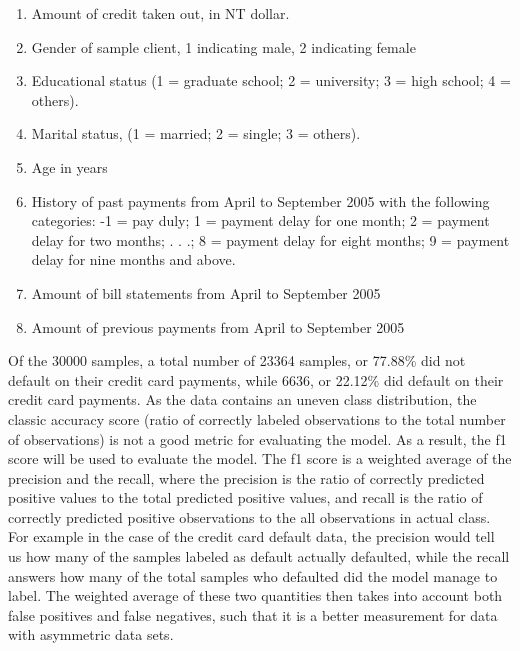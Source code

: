 \documentclass[a4paper,10pt,english]{article}
\begin{document}
\begin{enumerate}
    \item Amount of credit taken out, in NT dollar.
    \item Gender of sample client, 1 indicating male, 2 indicating female
    \item Educational status (1 = graduate school; 2 = university; 3 = high school; 4 = others).
    \item Marital status, (1 = married; 2 = single; 3 = others).
    \item Age in years
    \item History of past payments from April to September 2005 with the following categories: -1 = pay duly; 1 = payment delay for one month; 2 = payment delay for two months; . . .; 8 = payment delay for eight months; 9 = payment delay for nine months and above.
    \item Amount of bill statements from April to September 2005
    \item Amount of previous payments from April to September 2005
\end{enumerate}

Of the 30000 samples, a total number of 23364 samples, or 77.88\% did not default on their credit card payments, while 6636, or 22.12\% did default on their credit card payments. As the data contains an uneven class distribution, the classic accuracy score (ratio of correctly labeled observations to the total number of observations) is not a good metric for evaluating the model. As a result, the f1 score will be used to evaluate the model. The f1 score is a weighted average of the precision and the recall, where the precision is the ratio of correctly predicted positive values to the total predicted positive values, and recall is the ratio of correctly predicted positive observations to the all observations in actual class. For example in the case of the credit card default data, the precision would tell us how many of the samples labeled as default actually defaulted, while the recall answers how many of the total samples who defaulted did the model manage to label. The weighted average of these two quantities then takes into account both false positives and false negatives, such that it is a better measurement for data with asymmetric data sets.
\end{document}
